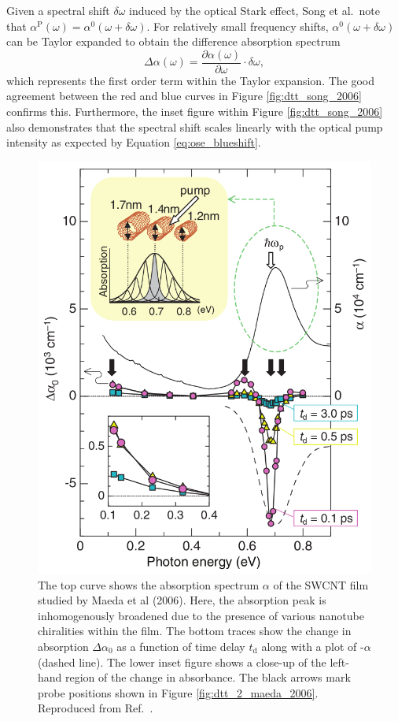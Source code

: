 Given a spectral shift $\delta \omega$ induced by the optical Stark effect, Song et al.\ note that $\alpha^\text{P}(\omega) = \alpha^0 (\omega + \delta \omega)$. For relatively small frequency shifts, $\alpha^0 (\omega + \delta \omega)$ can be Taylor expanded to obtain the difference absorption spectrum
\begin{equation}
	\Delta \alpha(\omega) = \frac{\partial \alpha(\omega)}{\partial \omega} \cdot \delta\omega,
\end{equation}
which represents the first order term within the Taylor expansion. The good agreement between the red and blue curves in Figure \ref{fig:dtt_song_2006} confirms this. Furthermore, the inset figure within Figure \ref{fig:dtt_song_2006} also demonstrates that the spectral shift scales linearly with the optical pump intensity as expected by Equation \eqref{eq:ose_blueshift}.

\begin{figure}[H]
	\centering
	\includegraphics[scale=0.35]{images/chapter_prior_works/stark_shift_maeda}
	\caption{The top curve shows the absorption spectrum $\alpha$ of the SWCNT film studied by Maeda et al (2006). Here, the absorption peak is inhomogenously broadened due to the presence of various nanotube chiralities within the film. The bottom traces show the change in absorption $\Delta \alpha_0$ as a function of time delay $t_\text{d}$ along with a plot of -$\alpha$ (dashed line). The lower inset figure shows a close-up of the left-hand region of the change in absorbance. The black arrows mark probe positions shown in Figure \ref{fig:dtt_2_maeda_2006}. Reproduced from Ref.\ \cite{maeda2006gigantic}.}
	\label{fig:abs_maeda_2006}
\end{figure}


